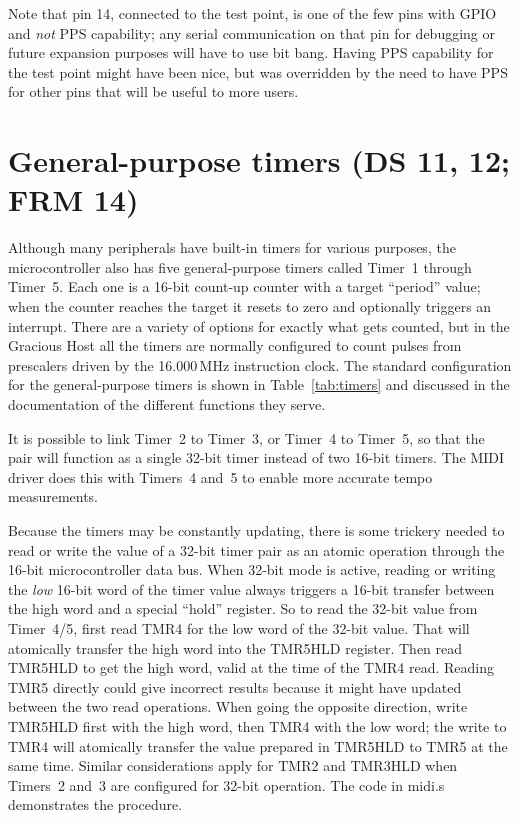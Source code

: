 Note that pin 14, connected to the test point, is one of the few pins with
GPIO and \emph{not} PPS capability; any serial communication on that pin for
debugging or future expansion purposes will have to use bit bang. 
Having PPS capability for the test point might have been nice, but was
overridden by the need to have PPS for other pins that will be useful to
more users.


\section{General-purpose timers (DS 11, 12; FRM 14)}

Although many peripherals have built-in timers for various purposes, the
microcontroller also has five general-purpose timers called Timer~1 through
Timer~5.  Each one is a 16-bit count-up counter with a target ``period''
value; when the counter reaches the target it resets to zero and optionally
triggers an interrupt.  There are a variety of options for exactly what gets
counted, but in the Gracious Host all the timers are normally configured to
count pulses from prescalers driven by the 16.000\,MHz instruction clock. 
The standard configuration for the general-purpose timers is shown in
Table~\ref{tab:timers} and discussed in the documentation of the different
functions they serve.

It is possible to link Timer~2 to Timer~3, or Timer~4 to Timer~5, so that
the pair will function as a single 32-bit timer instead of two 16-bit
timers.  The MIDI driver does this with Timers~4 and~5 to enable more
accurate tempo measurements.

Because the timers may be constantly updating, there is some trickery needed
to read or write the value of a 32-bit timer pair as an atomic operation
through the 16-bit microcontroller data bus.  When 32-bit mode is active,
reading or writing the \emph{low} 16-bit word of the timer value always
triggers a 16-bit transfer between the high word and a special ``hold''
register.  So to read the 32-bit value from Timer~4/5, first read TMR4 for
the low word of the 32-bit value.  That will atomically transfer the high
word into the TMR5HLD register.  Then read TMR5HLD to get the high word,
valid at the time of the TMR4 read.  Reading TMR5 directly could give
incorrect results because it might have updated between the two read
operations.  When going the opposite direction, write TMR5HLD first with the
high word, then TMR4 with the low word; the write to TMR4 will atomically
transfer the value prepared in TMR5HLD to TMR5 at the same time.  Similar
considerations apply for TMR2 and TMR3HLD when Timers~2 and~3 are configured
for 32-bit operation.  The code in midi.s demonstrates the procedure.

